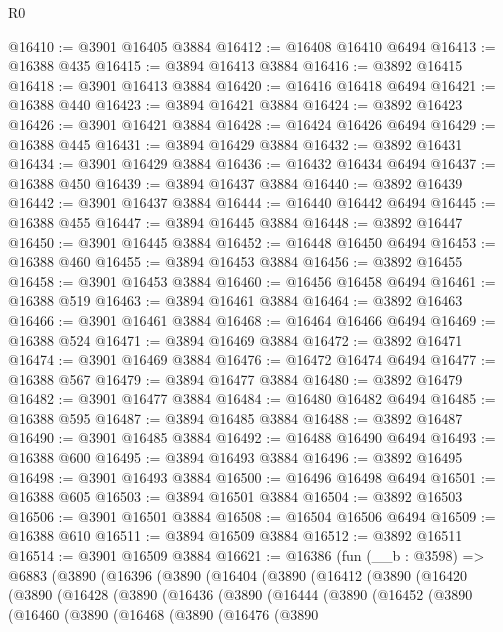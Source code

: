\begin{lexlean}{R0}
\begin{coremodule}
@16410 := @3901 @16405 @3884
@16412 := @16408 @16410 @6494
@16413 := @16388 @435
@16415 := @3894 @16413 @3884
@16416 := @3892 @16415
@16418 := @3901 @16413 @3884
@16420 := @16416 @16418 @6494
@16421 := @16388 @440
@16423 := @3894 @16421 @3884
@16424 := @3892 @16423
@16426 := @3901 @16421 @3884
@16428 := @16424 @16426 @6494
@16429 := @16388 @445
@16431 := @3894 @16429 @3884
@16432 := @3892 @16431
@16434 := @3901 @16429 @3884
@16436 := @16432 @16434 @6494
@16437 := @16388 @450
@16439 := @3894 @16437 @3884
@16440 := @3892 @16439
@16442 := @3901 @16437 @3884
@16444 := @16440 @16442 @6494
@16445 := @16388 @455
@16447 := @3894 @16445 @3884
@16448 := @3892 @16447
@16450 := @3901 @16445 @3884
@16452 := @16448 @16450 @6494
@16453 := @16388 @460
@16455 := @3894 @16453 @3884
@16456 := @3892 @16455
@16458 := @3901 @16453 @3884
@16460 := @16456 @16458 @6494
@16461 := @16388 @519
@16463 := @3894 @16461 @3884
@16464 := @3892 @16463
@16466 := @3901 @16461 @3884
@16468 := @16464 @16466 @6494
@16469 := @16388 @524
@16471 := @3894 @16469 @3884
@16472 := @3892 @16471
@16474 := @3901 @16469 @3884
@16476 := @16472 @16474 @6494
@16477 := @16388 @567
@16479 := @3894 @16477 @3884
@16480 := @3892 @16479
@16482 := @3901 @16477 @3884
@16484 := @16480 @16482 @6494
@16485 := @16388 @595
@16487 := @3894 @16485 @3884
@16488 := @3892 @16487
@16490 := @3901 @16485 @3884
@16492 := @16488 @16490 @6494
@16493 := @16388 @600
@16495 := @3894 @16493 @3884
@16496 := @3892 @16495
@16498 := @3901 @16493 @3884
@16500 := @16496 @16498 @6494
@16501 := @16388 @605
@16503 := @3894 @16501 @3884
@16504 := @3892 @16503
@16506 := @3901 @16501 @3884
@16508 := @16504 @16506 @6494
@16509 := @16388 @610
@16511 := @3894 @16509 @3884
@16512 := @3892 @16511
@16514 := @3901 @16509 @3884
@16621 := @16386
    (fun (__b : @3598) =>
    @6883
      (@3890
        (@16396
          (@3890
            (@16404
              (@3890
                (@16412
                  (@3890
                    (@16420
                      (@3890
                        (@16428
                          (@3890
                            (@16436
                              (@3890
                                (@16444
                                  (@3890
                                    (@16452
                                      (@3890
                                        (@16460
                                          (@3890
                                            (@16468
                                              (@3890
                                                (@16476
                                                  (@3890

\end{coremodule}
\end{lexlean}
